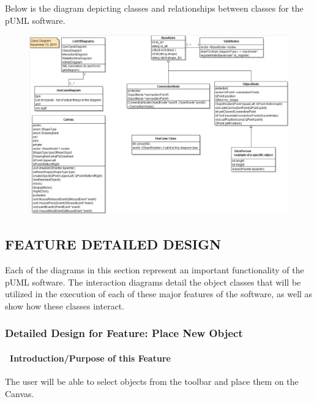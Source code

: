 \documentclass[twoside,letterpaper]{article}
\begin{document}
{{\color{black}
Below is the diagram depicting classes and relationships between classes for the pUML software.}

\begin{figure}[h]
\centering
\includegraphics[width=6.0in]{class.jpg}
\end{figure}

\clearpage


\subsection[FEATURE DETAILED DESIGN]
{\bfseries\color{black} FEATURE DETAILED DESIGN}
{\color{black}
Each of the diagrams in this section represent an important functionality
of the pUML software.  The interaction diagrams detail the object classes
that will be utilized in the execution of each of these major features of
the software, as well as show how these classes interact.
}

\subsubsection{Detailed Design for Feature: Place New Object }

\paragraph[\ Introduction/Purpose of this Feature]
{\ Introduction/Purpose of this Feature}
{\color{black}
The user will be able to select objects from the toolbar and place them on the Canvas.
}

}
\end{document}
